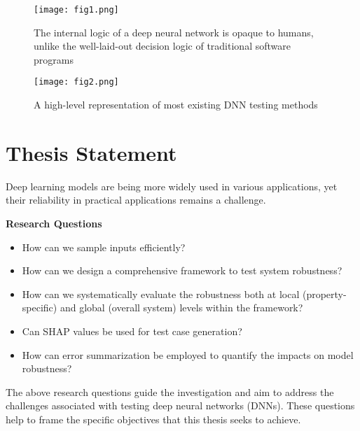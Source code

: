 \begin{figure*}[h]
	\centering
	\texttt{[image: fig1.png]}
	\caption{The internal logic of a deep neural network is opaque to humans, unlike the well-laid-out decision logic of traditional software programs \cite{Intro_1}}
	\label{fig:1}
\end{figure*}

\begin{figure*}[h]
	\centering
	\texttt{[image: fig2.png]}
	\caption{A high-level representation of most existing DNN testing methods \cite{Intro_1}}
	\label{fig:2}
\end{figure*}



\section{Thesis Statement}

Deep learning models are being more widely used in various applications, yet their reliability in practical applications remains a challenge.


  \smallskip\noindent%
  \textbf{Research Questions}\hypertarget{researchquestions}{}
  
  \begin{itemize}
      \item How can we sample inputs efficiently?
      \item How can we design a comprehensive framework to test system robustness?
      \item How can we systematically evaluate the robustness both at local (property-specific) and global (overall system) levels within the framework?
      \item Can SHAP values be used for test case generation?
      \item How can error summarization be employed to quantify the impacts on model robustness?
  \end{itemize}
  
  
  \smallskip\noindent%
  The above research questions guide the investigation and aim to address the challenges associated with testing deep neural networks (DNNs). These questions help to frame the specific objectives that this thesis seeks to achieve. 
  
